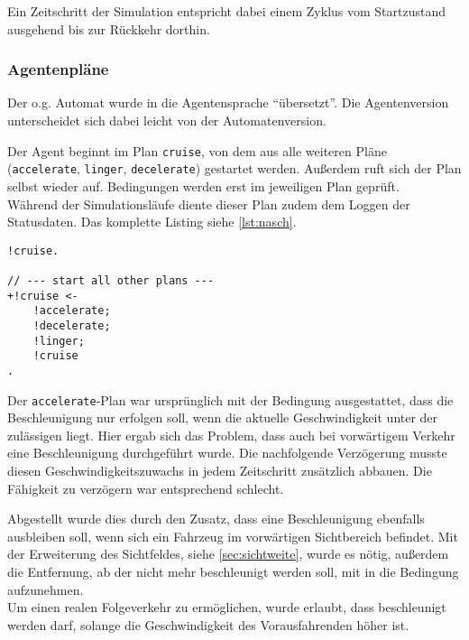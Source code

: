 Ein Zeitschritt der Simulation entspricht dabei einem Zyklus vom Startzustand ausgehend bis zur Rückkehr dorthin.


\subsubsection{Agentenpläne}

Der o.g. Automat wurde in die Agentensprache \enquote{übersetzt}. 
Die Agentenversion unterscheidet sich dabei leicht von der Automatenversion. 

Der Agent beginnt im Plan \texttt{cruise}, von dem aus alle weiteren Pläne (\texttt{accelerate}, \texttt{linger}, \texttt{decelerate}) gestartet werden.
Außerdem ruft sich der Plan selbst wieder auf.
Bedingungen werden erst im jeweiligen Plan geprüft.
\\
Während der Simulationsläufe diente dieser Plan zudem dem Loggen der Statusdaten.
Das komplette Listing siehe \cref{lst:nasch}.

\begin{minipage}[hptb]{0.95\textwidth}
\begin{lstlisting}[style=asl, 
                   keywords={!cruise}, 
                   keywords={[2]}, 
                   keywords={[3]}, 
                   caption={Auszug aus Agentenscript: single lane-Version},
                   label={lst:nasch-auszug}]      
!cruise.

// --- start all other plans ---
+!cruise <-
    !accelerate;
    !decelerate;
    !linger;
    !cruise
.\end{lstlisting}
\end{minipage}

Der \texttt{accelerate}-Plan war ursprünglich mit der Bedingung ausgestattet, dass die Beschleunigung nur erfolgen soll, wenn die aktuelle Geschwindigkeit unter der zulässigen liegt.
Hier ergab sich das Problem, dass auch bei vorwärtigem Verkehr eine Beschleunigung durchgeführt wurde. Die nachfolgende Verzögerung musste diesen Geschwindigkeitszuwachs in jedem Zeitschritt zusätzlich abbauen.
Die Fähigkeit zu verzögern war entsprechend schlecht.

Abgestellt wurde dies durch den Zusatz, dass eine Beschleunigung ebenfalls ausbleiben soll, wenn sich ein Fahrzeug im vorwärtigen Sichtbereich befindet.
Mit der Erweiterung des Sichtfeldes, siehe \cref{sec:sichtweite}, wurde es nötig, außerdem die Entfernung, ab der nicht mehr beschleunigt werden soll, mit in die Bedingung aufzunehmen.
\\
Um einen realen Folgeverkehr zu ermöglichen, wurde erlaubt, dass beschleunigt werden darf, solange die Geschwindigkeit des Vorausfahrenden höher ist.

